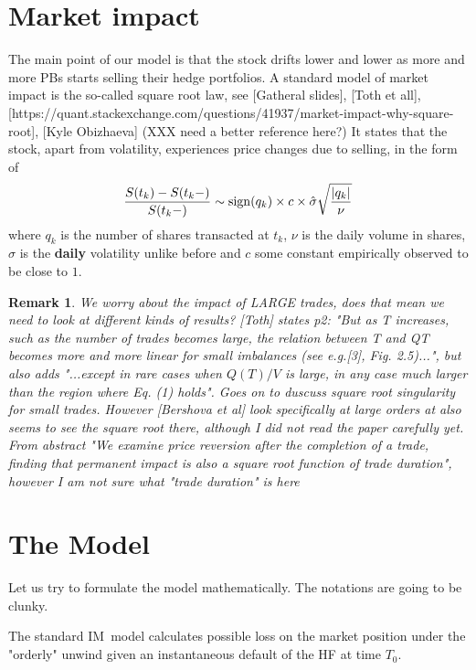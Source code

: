 \documentclass{article}
\newtheorem{remark}[theorem]{Remark}
\begin{document}
\section{Market impact}

The main point of our model is that the stock drifts lower and lower as more
and more PBs starts selling their hedge portfolios. A standard model of
market impact is the so-called square root law, see [Gatheral slides], [Toth
et all],
[https://quant.stackexchange.com/questions/41937/market-impact-why-square-root], [Kyle Obizhaeva] (XXX need a better reference here?) It states that the stock, apart from volatility, experiences price changes due to selling, in the form of%
\[
\frac{S(t_{k})-S(t_{k}-)}{S(t_{k}-)}\sim \limfunc{sign}(q_{k})\times c\times 
\hat{\sigma}\sqrt{\frac{\left\vert q_{k}\right\vert }{\nu }}
\]%
where $q_{k}$ is the number of shares transacted at $t_{k}$, $\nu $ is the
daily volume in shares, $\hat{\sigma}$ is the \textbf{daily} volatility
unlike before and $c$ some constant empirically observed to be close to $1.$ 

\begin{remark}
We worry about the impact of LARGE trades, does that mean we need to look at
different kinds of results? [Toth] states p2: "But as T increases, such as
the number of trades becomes large, the relation between T and QT becomes
more and more linear for small imbalances (see e.g.[3], Fig. 2.5)...", but
also adds "...except in rare cases when $Q(T)/V$ is large, in any case much
larger than the region where Eq. (1) holds". Goes on to duscuss square root
singularity for small trades. However [Bershova et al] look specifically at
large orders at also seems to see the square root there, although I did not
read the paper carefully yet. From abstract "We examine price reversion
after the completion of a trade, finding that permanent impact is also a
square root function of trade duration", however I am not sure what "trade
duration" is here
\end{remark}

\section{The Model}

Let us try to formulate the model mathematically. The notations are going to
be clunky. 

The standard IM\ model calculates possible loss on the market position under
the "orderly" unwind given an instantaneous default of the HF at time $T_{0}.
$
\end{document}
